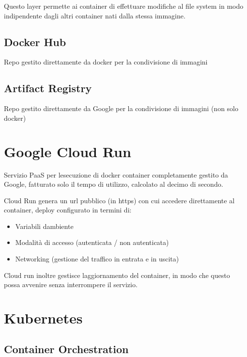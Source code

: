 Questo layer permette ai container di effettuare modifiche al file
system in modo indipendente dagli altri container nati dalla stessa
immagine.

\subsection{Docker Hub}\label{docker-hub}

Repo gestito direttamente da docker per la condivisione di immagini

\subsection{Artifact Registry}\label{artifact-registry}

Repo gestito direttamente da Google per la condivisione di immagini (non
solo docker)

\section{Google Cloud Run}\label{google-cloud-run}

Servizio PaaS per l\textquotesingle esecuzione di docker container
completamente gestito da Google, fatturato solo il tempo di utilizzo,
calcolato al decimo di secondo.

Cloud Run genera un url pubblico (in https) con cui accedere
direttamente al container, deploy configurato in termini di:

\begin{itemize}
\item
  Variabili d\textquotesingle ambiente
\item
  Modalità di accesso (autenticata / non autenticata)
\item
  Networking (gestione del traffico in entrata e in uscita)
\end{itemize}

Cloud run inoltre gestisce l\textquotesingle aggiornamento del
container, in modo che questo possa avvenire senza interrompere il
servizio.

\section{Kubernetes}\label{kubernetes}

\subsection{Container Orchestration}\label{container-orchestration}

